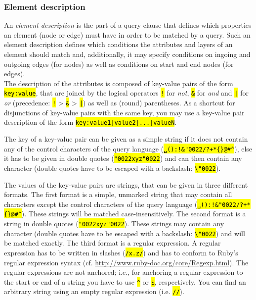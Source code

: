 \documentclass[12pt]{scrartcl}
\newcommand{\quo}{\char"0022}
\newcommand{\code}[1]{\hl{\texttt{#1}}}
\begin{document}
\subsubsection{Element description}\label{elementbeschreibung}

An \textit{element description} is the part of a query clause that defines which properties an element (node or edge) must have in order to be matched by a query.
Such an element description defines which conditions the attributes and layers of an element should match and, additionally, it may specify conditions on ingoing and outgoing edges (for nodes) as well as conditions on start and end nodes (for edges).\\

The description of the attributes is composed of key-value pairs of the form \code{key:value}, that are joined by the logical operators \code{!} for \textit{not}, \code{\&} for \textit{and} and \code{|} for \textit{or} (precedence: \code{!} > \code{\&} > \code{|}) as well as (round) parentheses.
As a shortcut for disjunctions of key-value pairs with the same key, you may use a key-value pair description of the form \code{key:value1|value2|...|valueN}.

The key of a key-value pair can be given as a simple string if it does not contain any of the control characters of the query language (\code{␣():!\&\quo/?+*\{\}@\#\textasciicircum}), else it has to be given in double quotes (\code{{\quo}xyz\quo}) and can then contain any character (double quotes have to be escaped with a backslash: \code{\textbackslash\quo}).

\label{zeichenketten}The values of the key-value pairs are strings, that can be given in three different formats.
The first format is a simple, unmarked string that may contain all characters except the control characters of the query language (\code{␣():!\&\quo/?+*\{\}@\#\textasciicircum}).
These strings will be matched case-insensitively.
The second format is a string in double quotes (\code{{\quo}xyz\quo}).
These strings may contain any character (double quotes have to be escaped with a backslash: \code{\textbackslash\quo}) and will be matched exactly.
The third format is a regular expression.
A regular expression has to be written in slashes (\code{/x.z/}) and has to conform to Ruby’s regular expression syntax (cf. \url{http://www.ruby-doc.org/core/Regexp.html}).
The regular expressions are not anchored; i.e., for anchoring a regular expression to the start or end of a string you have to use \code{\textasciicircum} or \code{\$}, respectively.
You can find an arbitrary string using an empty regular expression (i.e. \code{//}).
\end{document}
